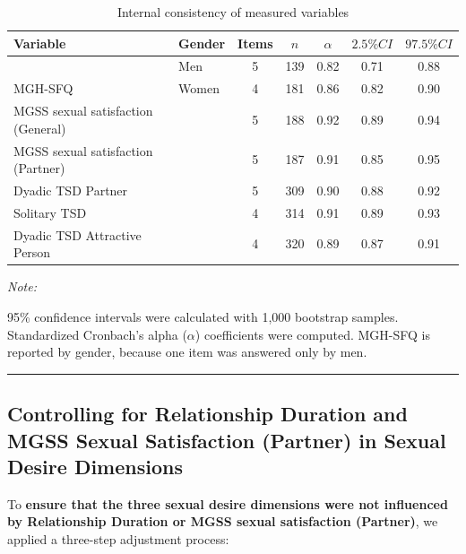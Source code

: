 \documentclass[
  bookmarksnumbered]{article}
\begin{document}
\begin{table}[H]
\centering
\caption{\label{tab:Cronbach-tab}Internal consistency of measured variables}
\centering
\begin{threeparttable}
\begin{tabular}[t]{llccccc}
\toprule
Variable & Gender & Items & $n$ & $\alpha$ & $2.5\% CI$ & $97.5\% CI$\\
\midrule
 & Men & 5 & 139 & 0.82 & 0.71 & 0.88\\
\cmidrule{2-7}
\multirow{-2}{*}{\raggedright\arraybackslash MGH-SFQ} & Women & 4 & 181 & 0.86 & 0.82 & 0.90\\
\cmidrule{1-7}
MGSS sexual satisfaction (General) &  & 5 & 188 & 0.92 & 0.89 & 0.94\\
\cmidrule{1-7}
MGSS sexual satisfaction (Partner) &  & 5 & 187 & 0.91 & 0.85 & 0.95\\
\cmidrule{1-7}
Dyadic TSD Partner &  & 5 & 309 & 0.90 & 0.88 & 0.92\\
\cmidrule{1-7}
Solitary TSD &  & 4 & 314 & 0.91 & 0.89 & 0.93\\
\cmidrule{1-7}
Dyadic TSD Attractive Person &  & 4 & 320 & 0.89 & 0.87 & 0.91\\
\bottomrule
\end{tabular}
\begin{tablenotes}[para]
\item \textit{Note: } 
\item 95\% confidence intervals were calculated with 1,000 bootstrap samples.
           Standardized Cronbach's alpha ($\alpha$) coefficients were computed.
           MGH-SFQ is reported by gender, because one item was answered only by men.
\end{tablenotes}
\end{threeparttable}
\end{table}

\begin{center}\rule{0.5\linewidth}{0.5pt}\end{center}

\subsection{Controlling for Relationship Duration and MGSS Sexual Satisfaction (Partner) in Sexual Desire Dimensions}\label{controlling-for-relationship-duration-and-mgss-sexual-satisfaction-partner-in-sexual-desire-dimensions}

To \textbf{ensure that the three sexual desire dimensions were not influenced by Relationship Duration or MGSS sexual satisfaction (Partner)}, we applied a three-step adjustment process:
\end{document}
